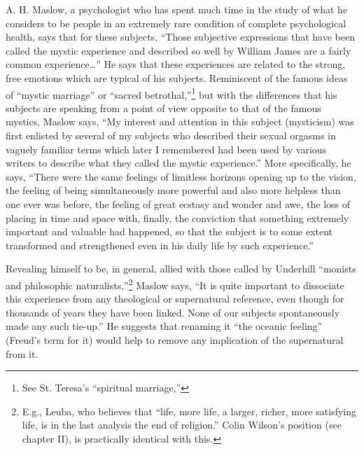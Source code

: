 A. H. Maslow, a psychologist who has spent much time in the
study of what he considers to be people in an extremely rare condition
of complete psychological health, says that for these subjects, \enquote{Those
subjective expressions that have been called the mystic experience and described so well by
William James are a fairly common experience\dots}\supercite{maslow:motivation-personality}
He says that these experiences are related to the strong, free emotions which
are typical of his subjects. Reminiscent of the famous ideas of
\enquote{mystic marriage} or \enquote{sacred betrothal,}\footnote{See St. Teresa's \enquote{spiritual marriage,}\supercite{underhill:mysticism}}
but with the differences that his subjects are speaking from a point of view
opposite to that of the famous mystics, Maslow says, \enquote{My interest and attention
in this subject (mysticism) was first enlisted by several of my subjects who described their
sexual orgasms in vaguely familiar terms which later I remembered had been used by
various writers to describe what they called the mystic experience.} More specifically,
he says, \enquote{There were the same feelings of limitless horizons opening up to the vision,
the feeling of being simultaneously more powerful and also more helpless than one ever
was before, the feeling of great ecstasy and wonder and awe, the loss of placing
in time and space with, finally, the conviction that something extremely important and
valuable had happened, so that the subject is to some extent transformed and
strengthened even in his daily life by such experience.}\supercite{maslow:motivation-personality}

\clearpage

Revealing himself to be, in general, allied with those
called by Underhill \enquote{monists and philosophic naturalists,}\footnote{E.g., Leuba, who believes that \enquote{life, more life, a larger, richer, more satisfying life, is in the last analysis the end of religion.}\supercite{oxford:the-monist} Colin Wilson's position (see chapter II), is practically identical with this.}
Maslow says, \enquote{It is quite important to dissociate this experience
from any theological or supernatural reference, even
though for thousands of years they have been linked. None
of our subjects spontaneously made any such tie-up.}\supercite{maslow:motivation-personality}
He suggests that renaming it \enquote{the oceanic feeling} (Freud's term for it)
would help to remove any implication of the supernatural from it.

